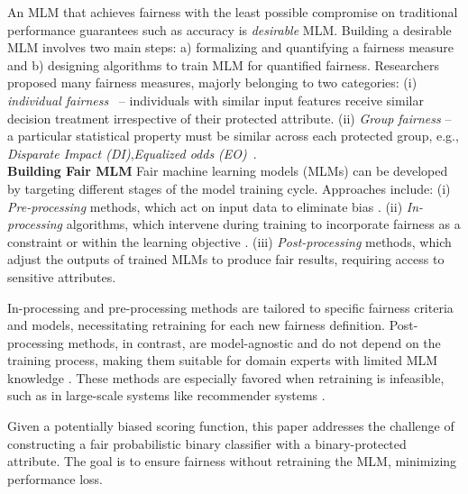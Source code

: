 \documentclass{article}
\begin{document}
An MLM that achieves fairness with the least possible compromise on traditional performance guarantees such as accuracy is \emph{desirable} MLM. Building a desirable MLM involves two main steps: a) formalizing and quantifying a fairness measure and b) designing algorithms to train MLM for quantified fairness. 
%
Researchers proposed many fairness measures, majorly belonging to two categories: (i) \emph{individual fairness}~\cite{dwork12} -- individuals with similar input features receive similar decision treatment irrespective of their protected attribute. (ii) \emph{Group fairness} -- a particular statistical property must be similar across each protected group, e.g., \emph{Disparate Impact (DI)},\emph{Equalized odds (EO)}~\cite{madras2018learning}.\\
\noindent\textbf{Building Fair MLM} Fair machine learning models (MLMs) can be developed by targeting different stages of the model training cycle. Approaches include:
(i) \emph{Pre-processing} methods, which act on input data to eliminate bias \citep{feldman15, zemel13}.
(ii) \emph{In-processing} algorithms, which intervene during training to incorporate fairness as a constraint or within the learning objective \citep{padala21}.
(iii) \emph{Post-processing} methods, which adjust the outputs of trained MLMs to produce fair results, requiring access to sensitive attributes.

In-processing and pre-processing methods are tailored to specific fairness criteria and models, necessitating retraining for each new fairness definition. Post-processing methods, in contrast, are model-agnostic and do not depend on the training process, making them suitable for domain experts with limited MLM knowledge \citep{sleeman95}. These methods are especially favored when retraining is infeasible, such as in large-scale systems like recommender systems \citep{nandy22}.

Given a potentially biased scoring function, this paper addresses the challenge of constructing a fair probabilistic binary classifier with a binary-protected attribute. The goal is to ensure fairness without retraining the MLM, minimizing performance loss.
\end{document}

